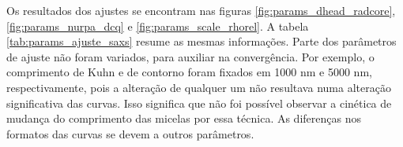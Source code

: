 	Os resultados dos ajustes se encontram nas figuras \ref{fig:params_dhead_radcore}, \ref{fig:params_nurpa_dcq} e \ref{fig:params_scale_rhorel}. A tabela \ref{tab:params_ajuste_saxs} resume as mesmas informações. Parte dos parâmetros de ajuste não foram variados, para auxiliar na convergência. Por exemplo, o comprimento de Kuhn e de contorno foram fixados em 1000 nm e 5000 nm, respectivamente, pois a alteração de qualquer um não resultava numa alteração significativa das curvas. Isso significa que não foi possível observar a cinética de mudança do comprimento das micelas por essa técnica. As diferenças nos formatos das curvas se devem a outros parâmetros.
		
		
